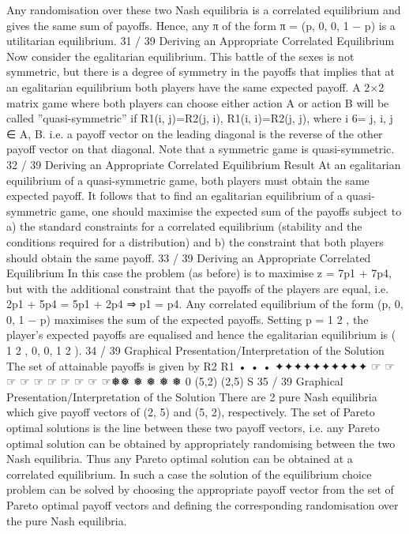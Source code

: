 Any randomisation over these two Nash equilibria is a correlated
equilibrium and gives the same sum of payoffs.
Hence, any π of the form π = (p, 0, 0, 1 − p) is a utilitarian
equilibrium.
31 / 39
Deriving an Appropriate Correlated Equilibrium
Now consider the egalitarian equilibrium. This battle of the sexes
is not symmetric, but there is a degree of symmetry in the payoffs
that implies that at an egalitarian equilibrium both players have
the same expected payoff.
A 2×2 matrix game where both players can choose either action A
or action B will be called ”quasi-symmetric” if
R1(i, j)=R2(j, i),
R1(i, i)=R2(j, j), where i 6= j, i, j ∈ {A, B}.
i.e. a payoff vector on the leading diagonal is the reverse of the
other payoff vector on that diagonal. Note that a symmetric game
is quasi-symmetric.
32 / 39
Deriving an Appropriate Correlated Equilibrium
Result At an egalitarian equilibrium of a quasi-symmetric game,
both players must obtain the same expected payoff.
It follows that to find an egalitarian equilibrium of a
quasi-symmetric game, one should maximise the expected sum of
the payoffs subject to a) the standard constraints for a correlated
equilibrium (stability and the conditions required for a distribution)
and b) the constraint that both players should obtain the same
payoff.
33 / 39
Deriving an Appropriate Correlated Equilibrium
In this case the problem (as before) is to maximise z = 7p1 + 7p4,
but with the additional constraint that the payoffs of the players
are equal, i.e.
2p1 + 5p4 = 5p1 + 2p4 ⇒ p1 = p4.
Any correlated equilibrium of the form (p, 0, 0, 1 − p) maximises
the sum of the expected payoffs.
Setting p =
1
2
, the player’s expected payoffs are equalised and
hence the egalitarian equilibrium is ( 1
2
, 0, 0,
1
2
).
34 / 39
Graphical Presentation/Interpretation of the Solution
The set of attainable payoffs is given by
R2
R1
•
•
•
✦✦✦✦✦✦✦✦✦✦
☞
☞
☞
☞
☞
☞
☞
☞
☞
☞❅❅
❅
❅
❅
❅
0
(5,2)
(2,5)
S
35 / 39
Graphical Presentation/Interpretation of the Solution
There are 2 pure Nash equilibria which give payoff vectors of (2, 5)
and (5, 2), respectively.
The set of Pareto optimal solutions is the line between these two
payoff vectors, i.e. any Pareto optimal solution can be obtained by
appropriately randomising between the two Nash equilibria.
Thus any Pareto optimal solution can be obtained at a correlated
equilibrium.
In such a case the solution of the equilibrium choice problem can
be solved by choosing the appropriate payoff vector from the set of
Pareto optimal payoff vectors and defining the corresponding
randomisation over the pure Nash equilibria.
